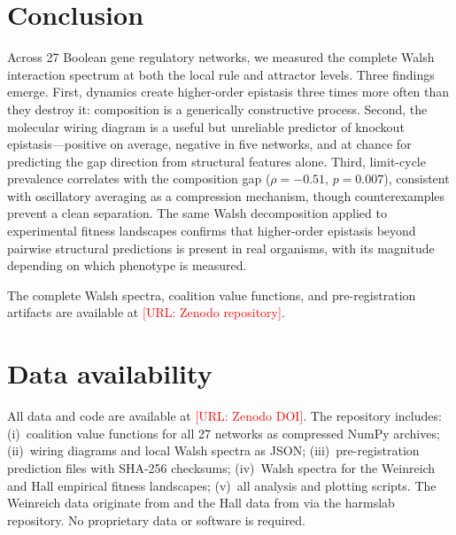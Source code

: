 \documentclass[10pt]{article}
\begin{document}
\section{Conclusion}
\label{sec:conclusion}

Across 27 Boolean gene regulatory networks, we measured the complete
Walsh interaction spectrum at both the local rule and attractor
levels. Three findings emerge. First, dynamics create higher-order
epistasis three times more often than they destroy it: composition
is a generically constructive process. Second, the molecular wiring
diagram is a useful but unreliable predictor of knockout
epistasis---positive on average, negative in five networks, and at
chance for predicting the gap direction from structural features
alone. Third, limit-cycle prevalence correlates with the composition
gap ($\rho = -0.51$, $p = 0.007$), consistent with oscillatory
averaging as a compression mechanism, though counterexamples prevent
a clean separation. The same Walsh decomposition applied to
experimental fitness landscapes confirms that higher-order epistasis
beyond pairwise structural predictions is present in real
organisms, with its magnitude depending on which phenotype is
measured.

The complete Walsh spectra, coalition value functions, and
pre-registration artifacts are available at
\textcolor{red}{[URL: Zenodo repository]}.


\section*{Data availability}

All data and code are available at \textcolor{red}{[URL: Zenodo DOI]}.
The repository includes: (i)~coalition value functions for all 27
networks as compressed NumPy archives; (ii)~wiring diagrams and local
Walsh spectra as JSON; (iii)~pre-registration prediction files with
SHA-256 checksums; (iv)~Walsh spectra for the Weinreich and Hall
empirical fitness landscapes; (v)~all analysis and plotting scripts.
The Weinreich data originate from \citet{weinreich2006darwinian} and
the Hall data from \citet{hall2010fitness} via the harmslab
repository. No proprietary data or software is required.
\end{document}
